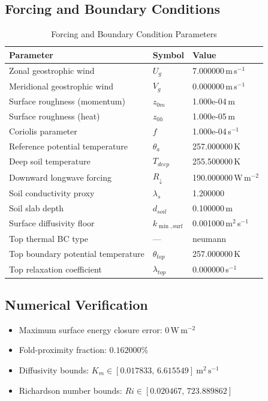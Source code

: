 \subsection{Forcing and Boundary Conditions}
\begin{table}[htbp]
\centering
\caption{Forcing and Boundary Condition Parameters}
\label{tab:scm_parameters_sheba_sheba_160x2m_12h_report}
\begin{tabular}{lll}
\hline
{\bfseries Parameter} & {\bfseries Symbol} & {\bfseries Value} \\
\hline
Zonal geostrophic wind & $U_g$ & 7.000000\,m\,s$^{-1}$ \\
Meridional geostrophic wind & $V_g$ & 0.000000\,m\,s$^{-1}$ \\
Surface roughness (momentum) & $z_{0m}$ & 1.000e-04\,m \\
Surface roughness (heat) & $z_{0h}$ & 1.000e-05\,m \\
Coriolis parameter & $f$ & 1.000e-04\,s$^{-1}$ \\
Reference potential temperature & $\theta_a$ & 257.000000\,K \\
Deep soil temperature & $T_{deep}$ & 255.500000\,K \\
Downward longwave forcing & $R_{\downarrow}$ & 190.000000\,W\,m$^{-2}$ \\
Soil conductivity proxy & $\lambda_s$ & 1.200000 \\
Soil slab depth & $d_{soil}$ & 0.100000\,m \\
Surface diffusivity floor & $k_{\min,\mathrm{surf}}$ & 0.001000\,m$^2$\,s$^{-1}$ \\
Top thermal BC type & --- & neumann \\
Top boundary potential temperature & $\theta_{top}$ & 257.000000\,K \\
Top relaxation coefficient & $\lambda_{top}$ & 0.000000\,s$^{-1}$ \\
\hline
\end{tabular}
\end{table}

\subsection{Numerical Verification}
\begin{itemize}
  \item Maximum surface energy closure error:
  $0\,\mathrm{W\,m^{-2}}$
  \item Fold-proximity fraction:
  $0.162000\%$
  \item Diffusivity bounds:
  $K_m \in [0.017833,\,6.615549]~\mathrm{m^2\,s^{-1}}$
  \item Richardson number bounds:
  $Ri \in [0.020467,\,723.889862]$
\end{itemize}

